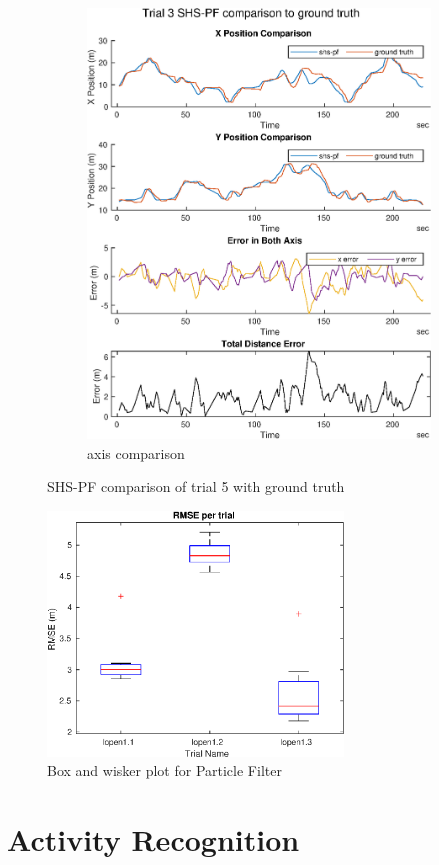 \begin{figure}[H]
\begin{subfigure}[t]{.45\textwidth}
		\includegraphics[width=\linewidth]{images/20201029_1804_shs-pf_trial_3_1}
		\caption{axis comparison}
		\label{fig:shspf_trial3_comparison}
	\end{subfigure}
	\caption{SHS-PF comparison of trial 5 with ground truth}
	\label{fig:shspf_trial3_shs_gt_comparison}
\end{figure}

\begin{figure}[H]
	\centering
	\includegraphics[width=0.7\textwidth]{images/20201101_1739_RMSE_per_trial}
	\caption{Box and wisker plot for Particle Filter}
	\label{fig:pf_boxplot}
\end{figure}


\section{Activity Recognition}
